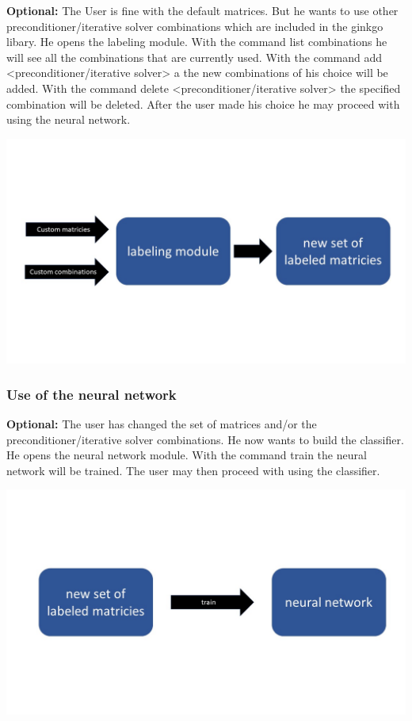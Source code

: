 \documentclass[parskip=full]{scrartcl}
\begin{document}
\textbf{Optional:} The User is fine with the default matrices. But he wants to use other preconditioner/iterative solver combinations which are included in the ginkgo libary. He opens the labeling module. With the command list combinations he will see all the combinations that are currently used. With the command add <preconditioner/iterative solver> a the new combinations of his choice will be added. With the command delete <preconditioner/iterative solver> the specified combination will be deleted. After the user made his choice he may proceed with using the neural network.
\begin{center}
\includegraphics[width=\textwidth]{labelingModule}
\end{center}


\subsubsection{Use of the neural network}
\textbf{Optional:} The user has changed the set of matrices and/or the preconditioner/iterative solver combinations. He now wants to build the classifier. He opens the neural network module. With the command train the neural network will be trained. The user may then proceed with using the classifier.

\begin{center}
\includegraphics[width=\textwidth]{neuralNetwork}
\end{center}
\end{document}
